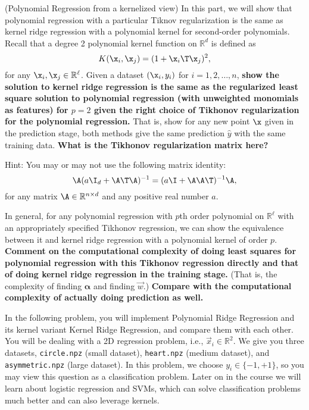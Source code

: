 \documentclass[preview]{standalone}
\begin{document}
\begin{Parts}
\Part (Polynomial Regression from a kernelized view) In this part, we will show that polynomial
regression with a particular Tiknov regularization is the same as kernel ridge regression with a
polynomial kernel for second-order polynomials. Recall that a degree 2 polynomial kernel function on
$\mathbb R^d$ is defined as
\begin{equation}
K(\x_i,\x_j) = (1+\x_i\T\x_j)^2,
\end{equation}
for any $\x_i,\x_j\in\mathbb R^\ell$. Given a dataset $(\x_i,y_i)$ for $i=1,2,\dots, n$, \textbf{show
the solution to kernel ridge regression is the same as the regularized least square solution to polynomial
regression (with unweighted monomials as features) for $p=2$ given the right choice of Tikhonov regularization for the polynomial
regression.} That is, show for any new point ${\x}$ given in the prediction stage, both methods
give the same prediction $\hat{y}$ with the same training data. \textbf{What is the Tikhonov regularization
matrix here?}

Hint: You may or may not use the following matrix identity:
\begin{equation}
\A(a \I_d + \A\T \A)^{-1} = (a \I + \A \A\T)^{-1}\A,
\end{equation}
for any matrix $\A\in\mathbb R^{n\times d}$ and any positive real number $a$.



\Part In general, for any polynomial regression with $p$th order polynomial on $\mathbb R^\ell$ with an
appropriately specified Tikhonov regression, we can show the equivalence between it and kernel ridge regression
with a polynomial kernel of order $p$.  {\bf Comment on the computational complexity of doing least
squares for polynomial regression with this Tikhonov regression directly and that of doing kernel
ridge regression in the training stage.} (That is, the complexity of finding $\pmb\alpha$ and finding
$\vec w$.) {\bf Compare with the computational complexity of actually doing prediction as well.}



\end{Parts}


In the following problem, you will implement Polynomial Ridge Regression and its kernel variant
Kernel Ridge Regression, and compare them with each other.  You will be dealing with a 2D
regression problem, i.e., $\vec x_i \in \mathbb{R}^2$.  We give you three datasets,
\texttt{circle.npz} (small dataset),  \texttt{heart.npz} (medium dataset), and
\texttt{asymmetric.npz} (large dataset).  In this problem, we choose $y_i \in \{-1, +1\}$, so you
may view this question as a classification problem. Later on in the course we will learn about
logistic regression and SVMs, which can solve classification problems much better and can also
leverage kernels.
\end{document}
